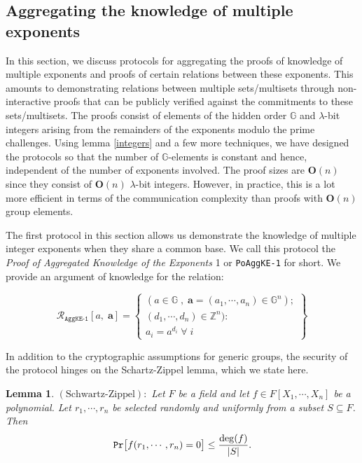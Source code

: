 \documentclass[11pt, lettersize, notitlepage, leqno, footskip=0.6cm]{article}
\newcommand{\bz}{\mathbb Z}
\newcommand{\ttt}{\texttt}
\newcommand{\mc}{\mathcal}
\newcommand{\mb}{\mathbb}
\newcommand{\mbf}{\mathbf}
\newcommand{\mr}{\mathrm}
\newcommand{\lam}{\lambda}
\newcommand{\sub}{\subseteq}
\newcommand{\bO}{\mbf{O}}
\newcommand{\vs}{\vspace{-0.15cm}}
\newcommand{\noin}{\noindent}
\newtheorem{Lem}[Thm]{Lemma}
\numberwithin{equation}{section}
\begin{document}






\subsection{\fontsize{11}{11}\selectfont Aggregating the knowledge of multiple exponents}

In this section, we discuss protocols for aggregating the proofs of knowledge of multiple exponents and proofs of certain relations between these exponents. This amounts to demonstrating relations between multiple sets/multisets through non-interactive proofs that can be publicly verified against the commitments to these sets/multisets. The proofs consist of elements of the hidden order $\mb{G}$ and $\lam$-bit integers arising from the remainders of the exponents modulo the prime challenges. Using lemma \ref{integers} and a few more techniques, we have designed the protocols so that the number of $\mb{G}$-elements is constant and hence, independent of the number of exponents involved. The proof sizes are $\bO(n)$ since they consist of $\bO(n)$ $\lam$-bit integers. However, in practice, this is a lot more efficient in terms of the communication complexity than proofs with $\bO(n)$ group elements.

The first protocol in this section allows us demonstrate the knowledge of multiple integer exponents when they share a common base. We call this protocol the \textit{Proof of Aggregated Knowledge of the Exponents} 1 or \verb|PoAggKE-1| for short. We provide an argument of knowledge for the relation: \vs

\[
  \mc{R}_{{\ttt{AggKE-1}}}[a,\; \mbf{a}] = \left\{\begin{array}{l}
    (a\in\mb{G}\;,\; \mbf{a} = (a_1,\cdots, a_n)\in\mb{G}^n);\\ 
    (d_1,\cdots,d_n)\in\bz^n):  \\
    a_i = a^{d_i}\;\forall\; i
  \end{array}\right\}
\]

\noin In addition to the cryptographic assumptions for generic groups, the security of the protocol hinges on the Schartz-Zippel lemma, which we state here.

\begin{Lem} $\mr{(Schwartz\text{-}Zippel)}:$ Let $F$ be a field and let $f\in F[X_1,\cdots,X_n]$ be a polynomial. Let $r_1,\cdots,r_n$ be selected randomly and uniformly from a subset $S\sub F$. Then \vs $${\tt{Pr}}\big[f(r_1,\cdots, r_n) = 0\big] \leq \frac{\deg(f)}{|S|}.$$\end{Lem}
\end{document}
